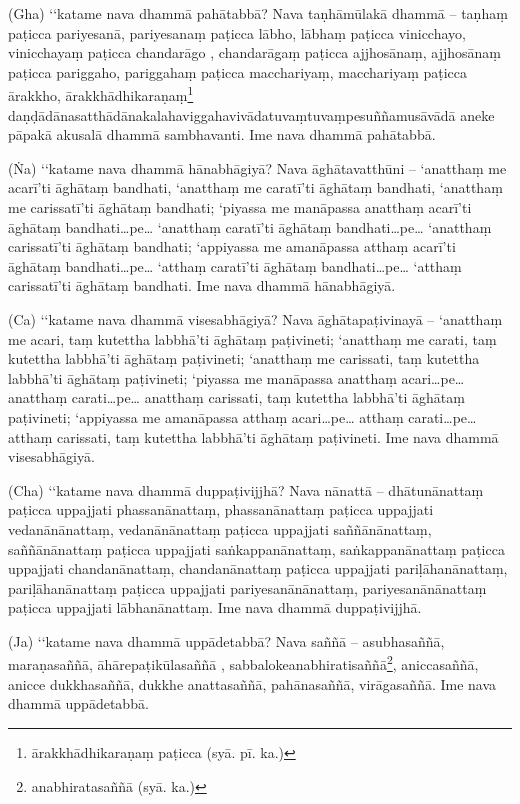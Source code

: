 (Gha) ‘‘katame nava dhammā pahātabbā? Nava taṇhāmūlakā dhammā – taṇhaṃ paṭicca pariyesanā, pariyesanaṃ paṭicca lābho, lābhaṃ paṭicca vinicchayo, vinicchayaṃ paṭicca chandarāgo , chandarāgaṃ paṭicca ajjhosānaṃ, ajjhosānaṃ paṭicca pariggaho, pariggahaṃ paṭicca macchariyaṃ, macchariyaṃ paṭicca ārakkho, ārakkhādhikaraṇaṃ\footnote{ārakkhādhikaraṇaṃ paṭicca (syā. pī. ka.)} daṇḍādānasatthādānakalahaviggahavivādatuvaṃtuvaṃpesuññamusāvādā aneke pāpakā akusalā dhammā sambhavanti. Ime nava dhammā pahātabbā.

(Ṅa) ‘‘katame nava dhammā hānabhāgiyā? Nava āghātavatthūni – ‘anatthaṃ me acarī’ti āghātaṃ bandhati, ‘anatthaṃ me caratī’ti āghātaṃ bandhati, ‘anatthaṃ me carissatī’ti āghātaṃ bandhati; ‘piyassa me manāpassa anatthaṃ acarī’ti āghātaṃ bandhati…pe… ‘anatthaṃ caratī’ti āghātaṃ bandhati…pe… ‘anatthaṃ carissatī’ti āghātaṃ bandhati; ‘appiyassa me amanāpassa atthaṃ acarī’ti āghātaṃ bandhati…pe… ‘atthaṃ caratī’ti āghātaṃ bandhati…pe… ‘atthaṃ carissatī’ti āghātaṃ bandhati. Ime nava dhammā hānabhāgiyā.

(Ca) ‘‘katame nava dhammā visesabhāgiyā? Nava āghātapaṭivinayā – ‘anatthaṃ me acari, taṃ kutettha labbhā’ti āghātaṃ paṭivineti; ‘anatthaṃ me carati, taṃ kutettha labbhā’ti āghātaṃ paṭivineti; ‘anatthaṃ me carissati, taṃ kutettha labbhā’ti āghātaṃ paṭivineti; ‘piyassa me manāpassa anatthaṃ acari…pe… anatthaṃ carati…pe… anatthaṃ carissati, taṃ kutettha labbhā’ti āghātaṃ paṭivineti; ‘appiyassa me amanāpassa atthaṃ acari…pe… atthaṃ carati…pe… atthaṃ carissati, taṃ kutettha labbhā’ti āghātaṃ paṭivineti. Ime nava dhammā visesabhāgiyā.

(Cha) ‘‘katame nava dhammā duppaṭivijjhā? Nava nānattā – dhātunānattaṃ paṭicca uppajjati phassanānattaṃ, phassanānattaṃ paṭicca uppajjati vedanānānattaṃ, vedanānānattaṃ paṭicca uppajjati saññānānattaṃ, saññānānattaṃ paṭicca uppajjati saṅkappanānattaṃ, saṅkappanānattaṃ paṭicca uppajjati chandanānattaṃ, chandanānattaṃ paṭicca uppajjati pariḷāhanānattaṃ, pariḷāhanānattaṃ paṭicca uppajjati pariyesanānānattaṃ, pariyesanānānattaṃ paṭicca uppajjati lābhanānattaṃ. Ime nava dhammā duppaṭivijjhā.

(Ja) ‘‘katame nava dhammā uppādetabbā? Nava saññā – asubhasaññā, maraṇasaññā, āhārepaṭikūlasaññā , sabbalokeanabhiratisaññā\footnote{anabhiratasaññā (syā. ka.)}, aniccasaññā, anicce dukkhasaññā, dukkhe anattasaññā, pahānasaññā, virāgasaññā. Ime nava dhammā uppādetabbā.


